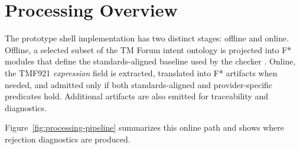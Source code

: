 \documentclass[conference]{IEEEtran}
\begin{document}
\section{Processing Overview}

The prototype shell implementation has two distinct stages: offline and online. Offline, a selected subset of the TM Forum intent ontology is projected into F* modules that define the standards-aligned baseline used by the checker \cite{tr292_tio,tr290a,tr292d,fstar_site,fstar_popl}. Online, the TMF921 \textit{expression} field is extracted, translated into F* artifacts when needed, and admitted only if both standards-aligned and provider-specific predicates hold. Additional artifacts are also emitted for traceability and diagnostics.

Figure~\ref{fig:processing-pipeline} summarizes this online path and shows where rejection diagnostics are produced.
\end{document}
